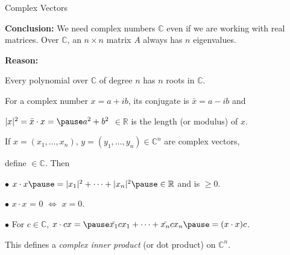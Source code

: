 \documentclass[handout]{beamer}
\newcommand{\BC}{\mbox{$\mathbb C$}}    \newcommand{\BD}{\mbox{$\mathbb D$}}
\newcommand{\BR}{\mbox{$\mathbb R$}}    \newcommand{\BL}{\mbox{$\mathbb L$}}
\begin{document}
\begin{frame}{Complex Vectors}\pause

\textcolor{dgreen}{\bf Conclusion:} \pause We need complex numbers $\BC$ \pause even if we are working with
real matrices. \pause Over $\BC$, an $n \times n$ matrix $A$ always has $n$ eigenvalues. \pause \medskip

\textcolor{dgreen}{\bf Reason:} \Ovalbox{\textcolor{blue}{Fundamental theorem of Algebra}} \pause \smallskip

Every polynomial over $\BC$ of degree $n$ \pause has $n$ roots in $\BC$. \pause\medskip

For a complex number $x = a + ib$, its conjugate is \pause $\bar{x} = a - ib$ \pause and

$|x|^2 = \bar{x}\cdot x = \pause a^2 + b^2$ \pause $\in \BR$ \pause is the length (or modulus) of $x$. \pause

If $x = (x_1,\ldots,x_n)$, $y = (y_1,\ldots, y_n) \in \BC^n$ are complex vectors, \pause\smallskip

define  \pause $\in \BC$. \pause Then\smallskip

$\bullet$ $x \cdot x \pause = |x_1|^2 + \cdots + |x_n|^2 \pause \in \BR$ \pause and is $\geq 0$. \pause

$\bullet$ $x \cdot x$ = 0 \pause $\Leftrightarrow$ $x = 0$. \pause

$\bullet$ For $c \in \BC$, \pause $x \cdot cx = \pause \bar{x_1}cx_1 + \cdots + \bar{x_n}cx_n \pause = (x \cdot x) c$. \pause \smallskip

This defines a \emph{complex inner product} (or dot product) on $\BC^n$.
\end{frame}
\end{document}
